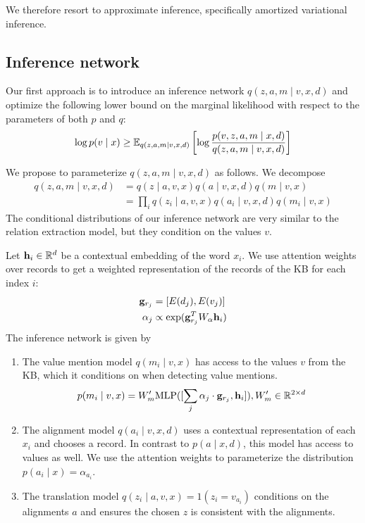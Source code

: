 \documentclass[12pt]{article}
\begin{document}
We therefore resort to approximate inference,
specifically amortized variational inference.

\subsection{Inference network}
Our first approach is to introduce an inference network $q(z,a,m\mid v,x,d)$
and optimize the following lower bound on the marginal likelihood
with respect to the parameters of both $p$ and $q$:
\begin{equation}
\label{eqn:lowerbound}
\log p(v\mid x) \geq
\mathbb{E}_{q(z,a,m\mid v,x,d)}\left[\log \frac{p(v,z,a,m\mid x,d)}{q(z,a,m\mid v,x,d)}\right]
\end{equation}

We propose to parameterize $q(z,a,m\mid v,x,d)$ as follows.
We decompose 
\begin{equation}
\begin{aligned}
q(z,a,m\mid v,x,d) &= q(z \mid a,v,x)q(a\mid v,x,d)q(m \mid v,x)\\
&= \prod_i q(z_i \mid a,v,x)q(a_i \mid v,x,d)q(m_i \mid v,x)
\end{aligned}
\end{equation}
The conditional distributions of our inference network
are very similar to the relation extraction model,
but they condition on the values $v$.

Let $\mathbf{h}_i \in \mathbb{R}^d$ be a contextual embedding of the word $x_i$.
We use attention weights over records to get a weighted representation
of the records of the KB for each index $i$:
\begin{align*}
\mathbf{g}_{r_j} &= [E(d_j), E(v_j)]\\
\alpha_j &\propto \exp(\mathbf{g}_{r_j}^T W_\alpha \mathbf{h}_i)
\end{align*}
The inference network is given by
\begin{enumerate}
\item The value mention model $q(m_i \mid v,x)$ 
    has access to the values $v$ from the KB, which it conditions on
    when detecting value mentions. 
    $$p(m_i \mid v,x) = W_m' \textrm{MLP}([\sum_j \alpha_j \cdot \mathbf{g}_{r_j}, \mathbf{h}_i]), W'_m \in \mathbb{R}^{2 \times d}$$
\item The alignment model $q(a_i \mid v,x,d)$
    uses a contextual representation of each $x_i$ and chooses a record.
    In contrast to $p(a\mid x,d)$, this model has access to values as well.
    We use the attention weights to parameterize the distribution
    $p(a_i \mid x) = \alpha_{a_i}$.
\item The translation model $q(z_i \mid a,v,x) = 1(z_i = v_{a_i})$
    conditions on the alignments $a$ and ensures the chosen $z$ is consistent
    with the alignments. 
\end{enumerate}
\end{document}
